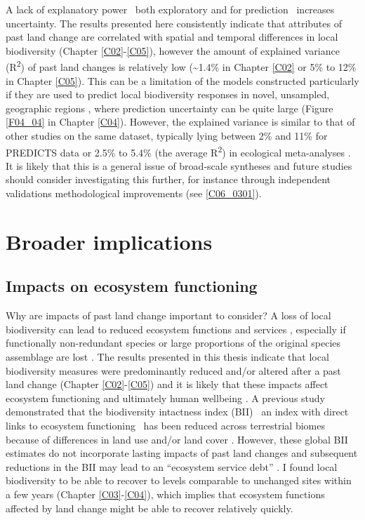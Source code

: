 A lack of explanatory power \textendash\ both exploratory and for prediction \textendash\ increases uncertainty. The results presented here consistently indicate that attributes of past land change are correlated with spatial and temporal differences in local biodiversity (Chapter \ref{C02}-\ref{C05}), however the amount of explained variance (R\textsuperscript{2}) of past land changes is relatively low (\textasciitilde 1.4\% in Chapter \ref{C02} or 5\% to 12\% in Chapter \ref{C05}). This can be a limitation of the models constructed particularly if they are used to predict local biodiversity responses in novel, \eg unsampled, geographic regions \citep{Jung2016}, where prediction uncertainty can be quite large (Figure \ref{F04_04} in Chapter \ref{C04}). However, the explained variance is similar to that of other studies on the same dataset, typically lying between 2\% and 11\% for PREDICTS data \citep{Newbold2014b,DePalma2015,Jung2016} or 2.5\% to 5.4\% (the average R\textsuperscript{2}) in ecological meta-analyses \citep{Moller2002}. It is likely that this is a general issue of broad-scale syntheses and future studies should consider investigating this further, for instance through independent validations methodological improvements (see \ref{C06_0301}).

\section{Broader implications}
\label{C06_02}
\subsection{Impacts on ecosystem functioning}
\label{C06_0201}

Why are impacts of past land change important to consider? A loss of local biodiversity can lead to reduced ecosystem functions and services \citep{Cardinale2012,Albrecht2014,Oliver2015b}, especially if functionally non-redundant species or large proportions of the original species assemblage are lost \citep{Oliver2015}. The results presented in this thesis indicate that local biodiversity measures were predominantly reduced and/or altered after a past land change (Chapter \ref{C02}-\ref{C05}) and it is likely that these impacts affect ecosystem functioning and ultimately human wellbeing \citep{Cardinale2012}. A previous study demonstrated that the biodiversity intactness index (BII) \textendash\ an index with direct links to ecosystem functioning \textendash\ has been reduced across terrestrial biomes because of differences in land use and/or land cover \citep{Newbold2016a}. However, these global BII estimates do not incorporate lasting impacts of past land changes and subsequent reductions in the BII may lead to an “ecosystem service debt” \citep{Isbell2015}. I found local biodiversity to be able to recover to levels comparable to unchanged sites within a few years (Chapter \ref{C03}-\ref{C04}), which implies that ecosystem functions affected by land change might be able to recover relatively quickly. 

